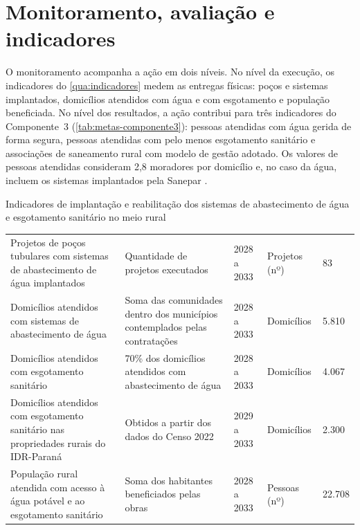 \section{Monitoramento, avaliação e indicadores}
\label{sec:monitoramento}

O monitoramento acompanha a ação em dois níveis. No nível da execução, os
indicadores do \autoref{qua:indicadores} medem as entregas físicas: poços e
sistemas implantados, domicílios atendidos com água e com esgotamento e
população beneficiada. No nível dos resultados, a ação contribui para três
indicadores do Componente~3 (\autoref{tab:metas-componente3}): pessoas
atendidas com água gerida de forma segura, pessoas atendidas com pelo menos
esgotamento sanitário e associações de saneamento rural com modelo de gestão
adotado. Os valores de pessoas atendidas consideram 2,8 moradores por
domicílio \cite{ibge2022} e, no caso da água, incluem os sistemas implantados
pela Sanepar \cite{mop2026}.

\begin{quadro}[htbp]
\caption{Indicadores de implantação e reabilitação dos sistemas de abastecimento de água e esgotamento sanitário no meio rural}
\label{qua:indicadores}
\footnotesize
\renewcommand{\arraystretch}{1.25}
\begin{tabularx}{\textwidth}{|L|L|Q{1.6cm}|P{2.2cm}|Q{1.4cm}|}
\hline
{} &  &  &
 &  \\ \hline
Projetos de poços tubulares com sistemas de abastecimento de água implantados &
Quantidade de projetos executados & 2028 a 2033 & Projetos (nº) & 83 \\ \hline
Domicílios atendidos com sistemas de abastecimento de água &
Soma das comunidades dentro dos municípios contemplados pelas contratações &
2028 a 2033 & Domicílios & 5.810 \\ \hline
Domicílios atendidos com esgotamento sanitário &
70\% dos domicílios atendidos com abastecimento de água &
2028 a 2033 & Domicílios & 4.067 \\ \hline
Domicílios atendidos com esgotamento sanitário nas propriedades rurais do IDR-Paraná &
Obtidos a partir dos dados do Censo 2022 & 2029 a 2033 & Domicílios & 2.300 \\ \hline
População rural atendida com acesso à água potável e ao esgotamento sanitário &
Soma dos habitantes beneficiados pelas obras & 2028 a 2033 &
Pessoas (nº) & 22.708 \\ \hline
\end{tabularx}
\end{quadro}


